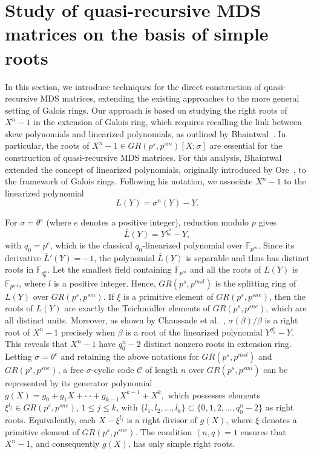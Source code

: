 \documentclass[11pt]{article}
\begin{document}
\section{Study of quasi-recursive MDS matrices on the basis of simple roots}\label{Sec:MDS-simple-roots}

In this section, we introduce techniques for the direct construction of quasi-recursive MDS matrices, extending the existing approaches to the more general setting of Galois rings. Our approach is based on studying the right roots of $X^n-1$ in the extension of Galois ring, which requires recalling the link between skew polynomials and linearized polynomials, as outlined by Bhaintwal~\cite{Bhaintwal2012Skew}. In particular, the roots of $X^n - 1 \in GR(p^s,p^{sm})[X;\sigma]$ are essential for the construction of quasi-recursive MDS matrices. For this analysis, Bhaintwal~\cite{Bhaintwal2012Skew} extended the concept of linearized polynomials, originally introduced by Ore~\cite{Orespecialclass}, to the framework of Galois rings. Following his notation, we associate  $X^n-1$ to the linearized polynomial 
\[
    L(Y) = \sigma^n(Y) - Y.
\]

For $\sigma = \theta^e$ (where 
$e$ denotes a positive integer), reduction modulo $p$ gives 
\[
    \overline{L}(Y) = Y^{q_0^n} - Y,
\]
with $q_0 = p^e$, which is the classical $q_0$-linearized polynomial over $\mathbb{F}_{p^m}$.
 Since its derivative $\overline{L}'(Y) = -1$, the polynomial $\overline{L}(Y)$ is separable and thus has distinct roots in $\mathbb{F}_{q_0^n}$. Let the smallest field containing $\mathbb{F}_{p^m}$ and all the roots of $\overline{L(Y)}$ is $\mathbb{F}_{p^{ml}}$, where $l$ is a positive integer. Hence, $GR(p^s, p^{msl})$ is the splitting ring of $L(Y)$ over $GR(p^s, p^{sm})$.
 If $\xi$ is a primitive element of $GR(p^s,p^{sne})$, then the roots of $L(Y)$ are exactly the Teichm$\ddot{u}$ller elements of $GR(p^s,p^{sne})$, which are all distinct units. Moreover, as shown by Chaussade et al.~\cite[Lemma~4]{Chaussade2009}, $\sigma(\beta)/\beta$ is a right root of $X^n - 1$ precisely when $\beta$ is a root of the linearized polynomial $Y^{q_0^n} - Y$.
This reveals that $X^n-1$ have $q^n_0-2$ distinct nonzero roots in extension ring. Letting $\sigma = \theta^e$ and retaining the above notations for $GR(p^s, p^{msl})$ and $GR(p^s, p^{sne})$, a free $\sigma$-cyclic code $\mathcal{C}$ of length $n$ over $GR(p^s, p^{sml})$ can be represented by its generator polynomial 
\(
g(X) = g_0 + g_1X + \cdots + g_{k-1}X^{k-1} + X^k,
\)
which possesses elements $\xi^{l_j} \in GR(p^s, p^{sne})$, $1 \leq j \leq k$, with $\{l_1, l_2, \dots, l_k\} \subset \{0, 1, 2, \dots, q_0^n - 2\}$ as right roots. Equivalently, each $X - \xi^{l_j}$ is a right divisor of $g(X)$, where $\xi$ denotes a primitive element of $GR(p^s, p^{sne})$. The condition $(n, q) = 1$ ensures that $X^n - 1$, and consequently $g(X)$, has only simple right roots.  
\end{document}
